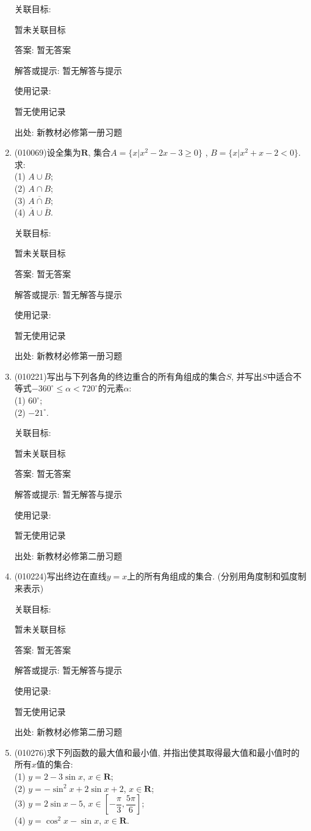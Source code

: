 \documentclass[10pt,a4paper]{article}
\begin{document}
\begin{enumerate}[1.]
关联目标:

暂未关联目标

答案: 暂无答案

解答或提示: 暂无解答与提示

使用记录:

暂无使用记录


出处: 新教材必修第一册习题
\item { (010069)}设全集为$\mathbf{R}$, 集合$A=\{x|x^2-2x-3\ge 0\}$
, $B=\{x|x^2+x-2<0\}$. 求:\\
(1) $A\cup B$;\\
(2) $A\cap B$;\\
(3) $\overline{A\cap B}$;\\
(4) $\overline A\cup \overline B$.


关联目标:

暂未关联目标

答案: 暂无答案

解答或提示: 暂无解答与提示

使用记录:

暂无使用记录


出处: 新教材必修第一册习题
\item { (010221)}写出与下列各角的终边重合的所有角组成的集合$S$, 并写出$S$中适合不等式$-360^\circ \le \alpha<720^\circ$的元素$\alpha$:\\
(1) $60^\circ$;\\
(2) $-21^\circ$.


关联目标:

暂未关联目标

答案: 暂无答案

解答或提示: 暂无解答与提示

使用记录:

暂无使用记录


出处: 新教材必修第二册习题
\item { (010224)}写出终边在直线$y=x$上的所有角组成的集合. (分别用角度制和弧度制来表示)


关联目标:

暂未关联目标

答案: 暂无答案

解答或提示: 暂无解答与提示

使用记录:

暂无使用记录


出处: 新教材必修第二册习题
\item { (010276)}求下列函数的最大值和最小值, 并指出使其取得最大值和最小值时的所有$x$值的集合:\\
(1) $y=2-3\sin x$, $x\in \mathbf{R}$;\\
(2) $y=-\sin^2x+2\sin x+2$, $x\in \mathbf{R}$;\\
(3) $y=2\sin x-5$, $x\in [-\dfrac \pi 3, \dfrac{5\pi} 6]$;\\
(4) $y=\cos^2x-\sin x$, $x\in \mathbf{R}$.



\end{enumerate}
\end{document}
